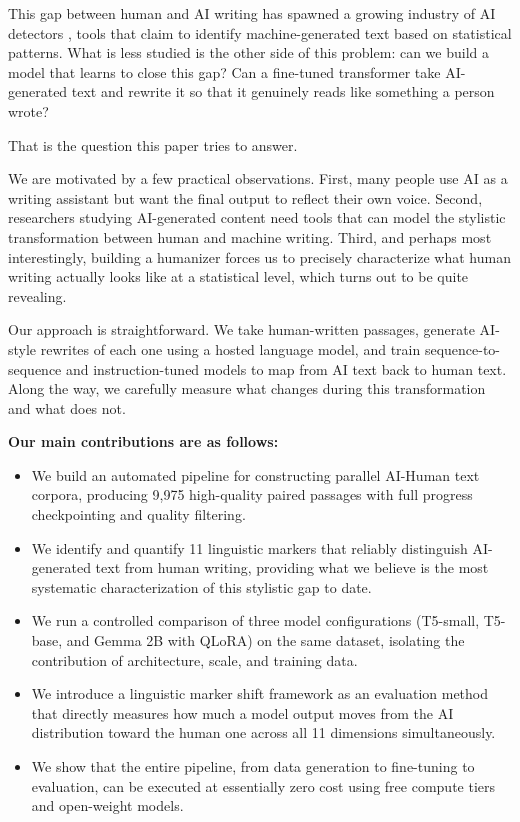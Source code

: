 \documentclass{article}
\begin{document}
This gap between human and AI writing has spawned a growing industry of AI detectors \cite{mitchell2023detectgpt, tang2023science}, tools that claim to identify machine-generated text based on statistical patterns. What is less studied is the other side of this problem: can we build a model that learns to close this gap? Can a fine-tuned transformer take AI-generated text and rewrite it so that it genuinely reads like something a person wrote?

That is the question this paper tries to answer.

We are motivated by a few practical observations. First, many people use AI as a writing assistant but want the final output to reflect their own voice. Second, researchers studying AI-generated content need tools that can model the stylistic transformation between human and machine writing. Third, and perhaps most interestingly, building a humanizer forces us to precisely characterize what human writing actually looks like at a statistical level, which turns out to be quite revealing.

Our approach is straightforward. We take human-written passages, generate AI-style rewrites of each one using a hosted language model, and train sequence-to-sequence and instruction-tuned models to map from AI text back to human text. Along the way, we carefully measure what changes during this transformation and what does not.

\textbf{Our main contributions are as follows:}

\begin{itemize}
    \item We build an automated pipeline for constructing parallel AI-Human text corpora, producing 9,975 high-quality paired passages with full progress checkpointing and quality filtering.
    
    \item We identify and quantify 11 linguistic markers that reliably distinguish AI-generated text from human writing, providing what we believe is the most systematic characterization of this stylistic gap to date.
    
    \item We run a controlled comparison of three model configurations (T5-small, T5-base, and Gemma 2B with QLoRA) on the same dataset, isolating the contribution of architecture, scale, and training data.
    
    \item We introduce a linguistic marker shift framework as an evaluation method that directly measures how much a model output moves from the AI distribution toward the human one across all 11 dimensions simultaneously.
    
    \item We show that the entire pipeline, from data generation to fine-tuning to evaluation, can be executed at essentially zero cost using free compute tiers and open-weight models.
\end{itemize}
\end{document}
